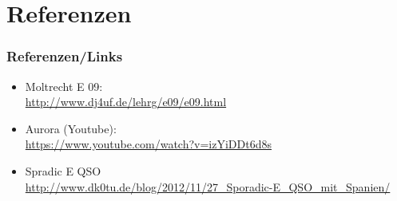 \section*{Referenzen}

\begin{frame}
    \frametitle{Referenzen/Links}
    
    \footnotesize
    \begin{itemize}
        \item Moltrecht E 09: \\
              \url{http://www.dj4uf.de/lehrg/e09/e09.html}
        \item Aurora (Youtube): \\
              \url{https://www.youtube.com/watch?v=izYiDDt6d8s}
        \item Spradic E QSO \\
              \url{http://www.dk0tu.de/blog/2012/11/27_Sporadic-E_QSO_mit_Spanien/}
    \end{itemize}

\end{frame}


